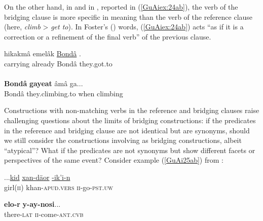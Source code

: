 \documentclass[output=paper]{LSP/langsci}
\begin{document}
On the other hand, in   and in , reported in (\ref{GuAiex:24ab}), the verb of the bridging clause is more specific in meaning than the verb of the reference clause (here, \textit{climb} > \textit{get to}). In Foster’s (\citeyear{foster81}) words, (\ref{GuAiex:24ab}) acts ``as if it is a correction or a refinement of the final verb'' of the previous clause.

\noindent\parbox{\textwidth}{%
\begin{exe}
\ex \label{GuAiex:24ab}
\begin{xlist}
\ex \label{GuAiex:24a}
\gll hikakmâ   emelâk \underline{Bondâ} \underline{}. \\
carrying   already Bondâ they.got.to\\
\glt {} \\
\ex \label{GuAiex:24b}
\gll  \textbf{Bondâ } \textbf{gayeat}     âmâ   ga...\\
 Bondâ they.climbing.to   when   climbing \\
\glt {}
\end{xlist}
\end{exe}}


Constructions with non-matching verbs in the reference and bridging clauses raise challenging questions about the limits of bridging constructions: if the predicates in the reference and bridging clause are not identical but are synonyms, should we still consider the constructions involving  as bridging constructions, albeit ``atypical''? What if the predicates are not synonyms but show different facets or perspectives of the same event? Consider example (\ref{GuAi25ab}) from :

\begin{exe}
	\ex	\label{GuAi25ab}
	\begin{xlist}
		\ex	\label{GuAi25a}
		\gll	...\underline{kid}  	\underline{xan-däor}   		\underline{-ik’i-n}\\
			 girl(\textsc{ii}) 	khan-\textsc{apud.vers} 	\textsc{ii}-go-\textsc{pst.uw} \\
		\glt	{}

		\ex	\label{GuAi25b}
		\gll			\textbf{elo-r}    	\textbf{y-ay-nosi}... \\
			there-\textsc{lat}	\textsc{ii}-come-\textsc{ant.cvb} 	  \\
		\glt	{}
	\end{xlist}
\end{exe}
\end{document}
